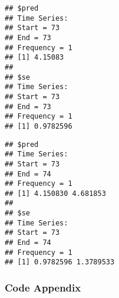 \documentclass[
]{article}
\begin{document}
\begin{verbatim}
## $pred
## Time Series:
## Start = 73 
## End = 73 
## Frequency = 1 
## [1] 4.15083
## 
## $se
## Time Series:
## Start = 73 
## End = 73 
## Frequency = 1 
## [1] 0.9782596
\end{verbatim}

\begin{verbatim}
## $pred
## Time Series:
## Start = 73 
## End = 74 
## Frequency = 1 
## [1] 4.150830 4.681853
## 
## $se
## Time Series:
## Start = 73 
## End = 74 
## Frequency = 1 
## [1] 0.9782596 1.3789533
\end{verbatim}

\hypertarget{code-appendix}{%
\subsubsection{Code Appendix}\label{code-appendix}}
\end{document}
